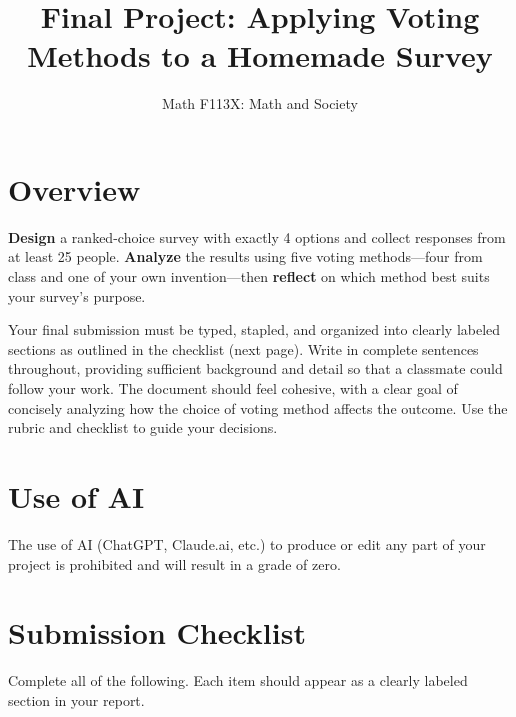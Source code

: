 \documentclass[11pt]{article}
\title{\textbf{Final Project: Applying Voting Methods to a Homemade Survey}}
\author{Math F113X: Math and Society}
\date{}
\begin{document}
\maketitle

\section*{Overview}
\textbf{Design} a ranked-choice survey with exactly 4 options and collect responses from at least 25 people. \textbf{Analyze} the results using five voting methods---four from class and one of your own invention---then \textbf{reflect} on which method best suits your survey's purpose.

Your final submission must be typed, stapled, and organized into clearly labeled sections as outlined in the checklist (next page). Write in complete sentences throughout, providing sufficient background and detail so that a classmate could follow your work. The document should feel cohesive, with a clear goal of concisely analyzing how the choice of voting method affects the outcome. Use the rubric and checklist to guide your decisions.

\section*{Use of AI}
The use of AI (ChatGPT, Claude.ai, etc.) to produce or edit any part of your project is prohibited and will result in a grade of zero.

\section*{Submission Checklist}

\noindent Complete all of the following. Each item should appear as a clearly labeled section in your report.
\end{document}
